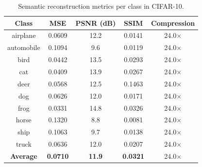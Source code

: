 \begin{table}[htbp]
\centering
\caption{Semantic reconstruction metrics per class in CIFAR-10.}
\label{tab:reconstruction}
\begin{tabular}{ccccc}
\hline
\textbf{Class} & \textbf{MSE} & \textbf{PSNR (dB)} & \textbf{SSIM} & \textbf{Compression} \\
\hline
airplane & 0.0609 & 12.2 & 0.0141 & 24.0$\times$ \\
automobile & 0.1094 & 9.6 & 0.0119 & 24.0$\times$ \\
bird & 0.0442 & 13.5 & 0.0293 & 24.0$\times$ \\
cat & 0.0409 & 13.9 & 0.0267 & 24.0$\times$ \\
deer & 0.0568 & 12.5 & 0.1463 & 24.0$\times$ \\
dog & 0.0626 & 12.0 & 0.0171 & 24.0$\times$ \\
frog & 0.0331 & 14.8 & 0.0326 & 24.0$\times$ \\
horse & 0.1320 & 8.8 & 0.0081 & 24.0$\times$ \\
ship & 0.1063 & 9.7 & 0.0138 & 24.0$\times$ \\
truck & 0.0636 & 12.0 & 0.0207 & 24.0$\times$ \\
\hline
\textbf{Average} & \textbf{0.0710} & \textbf{11.9} & \textbf{0.0321} & 24.0$\times$ \\
\hline
\end{tabular}
\end{table}
